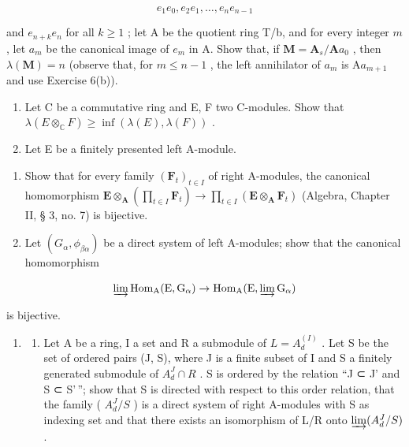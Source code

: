\[
e _ {1} e _ {0}, e _ {2} e _ {1}, \dots , e _ {n} e _ {n - 1}
\]

and \(e_{n+k}e_n\) for all \(k\geqslant 1\) ; let A be the quotient ring T/b, and for every integer \(m\) , let \(a_m\) be the canonical image of \(e_m\) in A. Show that, if \(\mathbf{M} = \mathbf{A}_s / \mathbf{A}a_0\) , then \(\lambda (\mathbf{M}) = n\) (observe that, for \(m\leqslant n - 1\) , the left annihilator of \(a_m\) is \(\mathrm{A}a_{m+1}\) and use Exercise 6(b)).

\begin{enumerate}
\def\labelenumi{\arabic{enumi}.}
\setcounter{enumi}{7}
\item
  Let C be a commutative ring and E, F two C-modules. Show that \(\lambda(E \otimes_{\mathbb{C}} F) \geqslant \inf(\lambda(E), \lambda(F))\) .
\item
  Let E be a finitely presented left A-module.
\end{enumerate}

\begin{enumerate}
\def\labelenumi{(\alph{enumi})}
\item
  Show that for every family \((\mathbf{F}_t)_{t \in I}\) of right A-modules, the canonical homomorphism \(\mathbf{E} \otimes_{\mathbf{A}} \left( \prod_{t \in I} \mathbf{F}_t \right) \to \prod_{t \in I} (\mathbf{E} \otimes_{\mathbf{A}} \mathbf{F}_t)\) (Algebra, Chapter II, § 3, no. 7) is bijective.
\item
  Let \((G_{\alpha}, \phi_{\beta\alpha})\) be a direct system of left A-modules; show that the canonical homomorphism
\end{enumerate}

\[
\varinjlim \operatorname{Hom} _ {\mathrm{A}} (\mathrm{E}, \mathrm{G} _ {\alpha}) \rightarrow \operatorname{Hom} _ {\mathrm{A}} (\mathrm{E}, \varinjlim \mathrm{G} _ {\alpha})
\]

is bijective.

\begin{enumerate}
\def\labelenumi{\arabic{enumi}.}
\setcounter{enumi}{9}
\tightlist
\item
  \begin{enumerate}
  \def\labelenumii{(\alph{enumii})}
  \tightlist
  \item
    Let A be a ring, I a set and R a submodule of \(L = A_{d}^{(I)}\) . Let S be the set of ordered pairs (J, S), where J is a finite subset of I and S a finitely generated submodule of \(A_{d}^{J} \cap R\) . S is ordered by the relation ``J ⊂ J' and S ⊂ S'\,''; show that S is directed with respect to this order relation, that the family ( \(A_{d}^{J}/S\) ) is a direct system of right A-modules with S as indexing set and that there exists an isomorphism of L/R onto \(\varinjlim (A_{d}^{J}/S)\) .
  \end{enumerate}
\end{enumerate}

